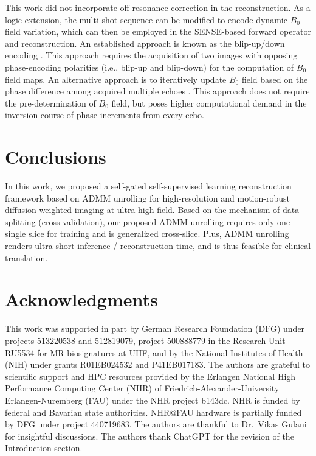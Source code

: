 \documentclass[AMA,STIX2COL,Linenumberson]{MRM}
\begin{document}
This work did not incorporate off-resonance correction in the reconstruction.
As a logic extension, the multi-shot sequence can be modified
to encode dynamic $B_0$ field variation, which can then be employed in the SENSE-based forward operator and reconstruction. An established approach
is known as the blip-up/down encoding \cite{zahneisen_2017_blipud}.
This approach requires the acquisition of two images
with opposing phase-encoding polarities (i.e., blip-up and blip-down)
for the computation of $B_0$ field maps.
An alternative approach is to iteratively update $B_0$ field
based on the phase difference among acquired multiple echoes \cite{tan_2023_meco}.
This approach does not require the pre-determination of $B_0$ field,
but poses higher computational demand in the inversion course of phase increments
from every echo.

\section{Conclusions}\label{SEC:CONCL}

In this work, we proposed a self-gated self-supervised learning
reconstruction framework based on ADMM unrolling
for high-resolution and motion-robust diffusion-weighted imaging
at ultra-high field.
Based on the mechanism of data splitting (cross validation),
our proposed ADMM unrolling requires only one single slice for training
and is generalized cross-slice.
Plus, ADMM unrolling renders ultra-short inference / reconstruction time,
and is thus feasible for clinical translation.

\section*{Acknowledgments}
This work was supported in part by
German Research Foundation (DFG)
under projects 513220538 and 512819079,
project 500888779 in the Research Unit RU5534
for MR biosignatures at UHF,
and by the National Institutes of Health (NIH)
under grants R01EB024532 and P41EB017183.
The authors are grateful to scientific support and HPC resources
provided by
the Erlangen National High Performance Computing Center (NHR)
of Friedrich-Alexander-University Erlangen-Nuremberg (FAU)
under the NHR project b143dc.
NHR is funded by federal and Bavarian state authorities.
NHR@FAU hardware is partially funded by
DFG under project 440719683. 
The authors are thankful to Dr.~Vikas Gulani for insightful discussions.
The authors thank ChatGPT for the revision of the Introduction section.
\end{document}
